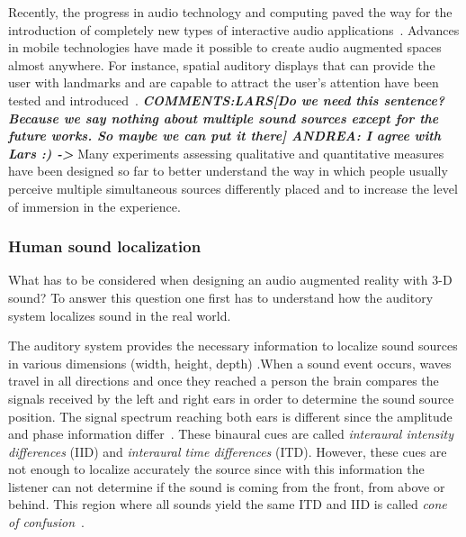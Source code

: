 \documentclass[journal]{IEEEtran}
\begin{document}
Recently, the progress in audio technology and computing paved the way for the introduction of completely new types of interactive audio applications~\cite{harma2004}. Advances in mobile technologies have made it possible to create audio augmented spaces almost anywhere. For instance, spatial auditory displays that can provide the user with landmarks and are capable to attract the user's attention have been tested and introduced~\cite{alvarez2011}. \textbf{\emph{COMMENTS:LARS[Do we need this sentence? Because we say nothing about multiple sound sources except for the future works. So maybe we can put it there] ANDREA: I agree with Lars :) ->}} Many experiments assessing qualitative and quantitative measures have been designed so far to better understand the way in which people usually perceive multiple simultaneous sources differently placed and to increase the level of immersion in the experience.

\subsubsection*{Human sound localization}
What has to be considered when designing an audio augmented reality with 3-D sound? To answer this question one first has to understand how the auditory system localizes sound in the real world. 

The auditory system provides the necessary information to localize sound sources in various dimensions (width, height, depth) \cite{Rumsey2001}.When a sound event occurs, waves travel in all directions and once they reached a person the brain compares the signals received by the left and right ears in order to determine the sound source position. The signal spectrum reaching both ears is different since the amplitude and phase information differ~\cite{Rumsey2001}. These binaural cues are called \emph{interaural intensity differences} (IID) and \emph{interaural time differences} (ITD). However, these cues are not enough to localize accurately the source since with this information the listener can not determine if the sound is coming from the front, from above or behind. This region where all sounds yield the same ITD and IID is called \textit{cone of confusion}~\cite{SpatialAudio2007}.
\end{document}
